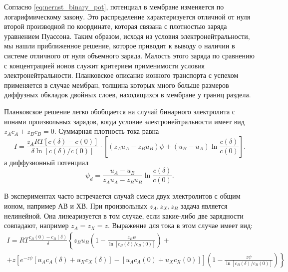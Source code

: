 Согласно \eqref{eq:nernst_binary_pot}, потенциал в мембране изменяется по
логарифмическому закону. Это распределение характеризуется отличной от нуля
второй производной по координате, которая связана с плотностью заряда уравнением
Пуассона. Таким образом, исходя из условия электронейтральности, мы нашли
приближенное решение, которое приводит к выводу о наличии в системе отличного от
нуля объемного заряда. Малость этого заряда по сравнению с концентрацией ионов
служит критерием применимости условия электронейтральности. Планковское описание
ионного транспорта с успехом применяется в случае мембран, толщина которых много
больше размеров диффузных обкладок двойных слоев, находящихся в мембране у
границ раздела.

Планковское решение легко обобщается на случай бинарного электролита с ионами
произвольных зарядов, когда условие электронейтральности имеет вид
\( z_Ac_A + z_Bc_B = 0\). Суммарная плотность тока равна
\begin{equation}
    I = \frac{z_ART[c(\delta) - c(0)]}{\delta\ln[c(\delta)/c(0)]}\cdot
    \left[(z_Au_A - z_Bu_B)\psi + (u_B - u_A)\ln\frac{c(\delta)}{c(0)}\right].
\end{equation}
а диффузионный потенциал
\begin{equation}
    \psi_d = \frac{u_A - u_B}{z_Au_A - z_Bu_B}\ln\frac{c(\delta)}{c(0)}.
\end{equation}

В экспериментах часто встречается случай смеси двух электролитов с общим ионом,
например АВ и ХВ. При произвольных \( z_A, z_X, z_B \) задача является
нелинейной. Она линеаризуется в том случае, если какие-либо две зарядности
совпадают, например \( z_A = z_X = z \). Выражение для тока в этом случае имеет
вид:
\begin{gather}
    I = RT\frac{c_B(0) - c_B(\delta)}{\delta}\left\{
        z_Bu_B\left(1-\frac{z_B\psi}{\ln[c_B(\delta)/c_B(0)]}\right)
        + \right.\\ +\left.
        z\left[e^{-z\psi}[u_Ac_A(\delta) + u_Xc_X(\delta)] -
        [u_Ac_A(0) + u_Xc_X(0)]\right]
        \left(1-\frac{z\psi}{\ln[c_B(\delta)/c_B(0)]}\right)\right\}
        \label{eq:nernst_ternary_current}
\end{gather}

